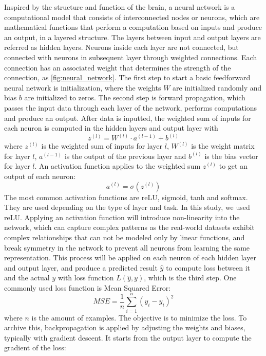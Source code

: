 \documentclass[12pt,a4paper,english
]{tunithesis}
\begin{document}
Inspired by the structure and function of the brain, a neural network is a computational model that consists of  interconnected nodes or neurons, which are mathematical functions that perform a computation based on inputs and produce an output, in a layered structure. The layers between input and output layers are referred as hidden layers. Neurons inside each layer are not connected, but connected with neurons in subsequent layer through weighted connections. Each connection has an associated weight that determines the strength of the connection, as \ref{fig:neural_network}. The first step to start a basic feedforward neural network is initialization, where the weights $W$ are initialized randomly and bias $b$ are initialized to zeros. The second step is forward propagation, which passes the input data through each layer of the network, performs computations and produce an output. After data is inputted, the weighted sum of inputs for each neuron is computed in the hidden layers and output layer with
\begin{equation*}
    z^{(l)}=W^{(l)} \cdot a^{(l-1)}+b^{(l)}
\end{equation*}
where $z^{(l)}$ is the weighted sum of inputs for layer $l$, $W^{(l)}$ is the weight matrix for layer $l$, $a^{(l-1)}$ is the output of the previous layer and $b^{(l)}$ is the bias vector for layer $l$. An activation function applies to the weighted sum $z^{(l)}$ to get an output of each neuron:
\begin{equation*}
    a^{(l)}=\sigma\left(z^{(l)}\right)
\end{equation*}
The most common activation functions are reLU, sigmoid, tanh and softmax. They are used depending on the type of layer and task. In this study, we used reLU. Applying an activation function will introduce non-linearity into the network, which can capture complex patterns as the real-world datasets exhibit complex relationships that can not be modeled only by linear functions, and break symmetry in the network to prevent all neurons from learning the same representation. This process will be applied on each neuron of each hidden layer and output layer, and produce a predicted result $\hat{y}$ to compute loss between it and the actual $y$ with loss function $L(\hat{y}, y)$, which is the third step. One commonly used loss function is Mean Squared Error:
\begin{equation*}
    M S E=\frac{1}{n} \sum_{i=1}^n\left(y_i-\hat{y}_i\right)^2
\end{equation*}
where $n$ is the amount of examples. The objective is to minimize the loss. To archive this, backpropagation is applied by adjusting the weights and biases, typically with gradient descent. It starts from the output layer to compute the gradient of the loss:
\end{document}
